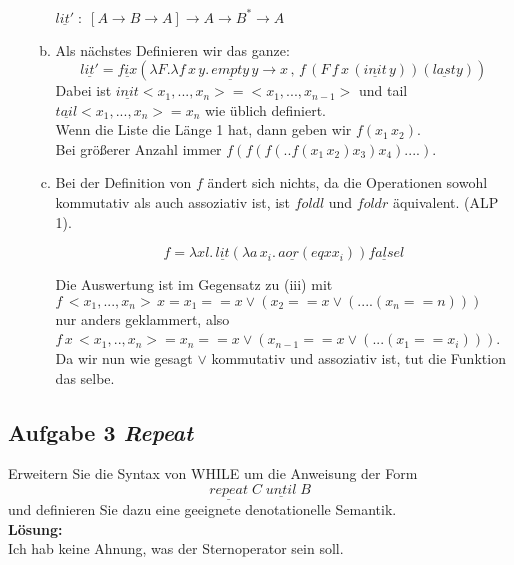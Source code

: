 \documentclass[11pt,a4paper,ngerman]{article}
\begin{document}
\begin{enumerate}[(i)]
\begin{enumerate}[a.]
            $\underline{lit'} \; : \; [A \rightarrow B \rightarrow A] \rightarrow A 
               \rightarrow B^* \rightarrow A$

         \item Als nächstes Definieren wir das ganze:\\
            $$
               \underline{lit'} = \underline{fix} \left( \lambda F. \lambda f \, x \, y .\,
                  \underline{empty} \, y \rightarrow x \, , \, f \, (F \, f \, x \, (\underline{init} \, y))
                     (\underline{last} y)
               \right)
            $$
            Dabei ist $\underline{init} <x_1,...,x_n> = <x_1,...,x_{n-1}>$ und
            tail $\underline{tail} <x_1,...,x_n> = x_n$ wie üblich definiert.\\
            Wenn die Liste die Länge 1 hat, dann geben wir $f (x_1 \, x_2)$.\\
            Bei größerer Anzahl immer $f(f(f(..f(x_1 \, x_2) x_3) x_4) ....)$.
  
         \item Bei der Definition von $f$ ändert sich nichts, da die Operationen sowohl
            kommutativ als auch assoziativ ist, ist $foldl$ und $foldr$ äquivalent. (ALP 1).
            
            $$
               f = \lambda x l. \, \underline{lit}
                  (\lambda a \, x_i. \, a \underline{or} (eq x x_i)) \underline{false} l
            $$

         Die Auswertung ist im Gegensatz zu (iii) mit\\
            $f \, <x_1,...,x_n> \, x= x_1 == x \lor (x_2 == x \lor ( .... (x_n == n)))$\\
         nur anders geklammert, also
            $f \, x \, <x_1,..,x_n> = x_n == x \lor (x_{n-1} == x \lor ( ... (x_1 == x_i)))$.\\
   
         Da wir nun wie gesagt $\lor$ kommutativ und assoziativ ist, tut die Funktion das selbe.
      \end{enumerate}

\end{enumerate}

\subsection*{Aufgabe 3 \mdseries\itshape Repeat}

Erweitern Sie die Syntax von WHILE um die Anweisung der Form
$$
   \underline{repeat} \; C \; \underline{until} \; B
$$
und definieren Sie dazu eine geeignete denotationelle Semantik.\\

\textbf{Lösung:}\\
  Ich hab keine Ahnung, was der Sternoperator sein soll. 

\label{LastPage}
\end{document}
